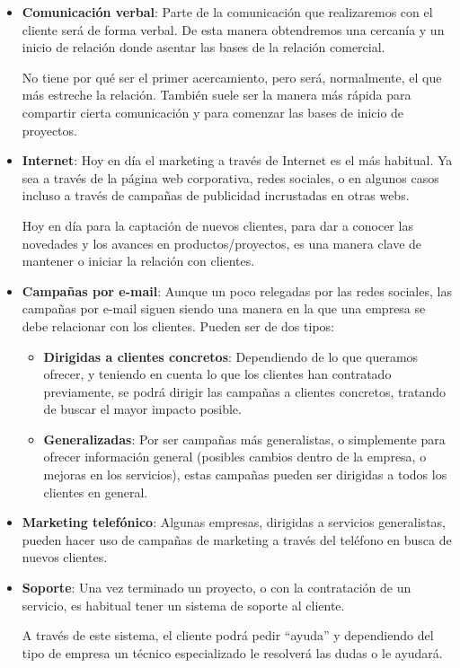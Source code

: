 \begin{itemize}
    \item \textbf{Comunicación verbal}: Parte de la comunicación que realizaremos con el cliente será de forma verbal. De esta manera obtendremos una cercanía y un inicio de relación donde asentar las bases de la relación comercial.

    No tiene por qué ser el primer acercamiento, pero será, normalmente, el que más estreche la relación. También suele ser la manera más rápida para compartir cierta comunicación y para comenzar las bases de inicio de proyectos.

    \item \textbf{Internet}: Hoy en día el marketing a través de Internet es el más habitual. Ya sea a través de la página web corporativa, redes sociales, o en algunos casos incluso a través de campañas de publicidad incrustadas en otras webs.

    Hoy en día para la captación de nuevos clientes, para dar a conocer las novedades y los avances en productos/proyectos, es una manera clave de mantener o iniciar la relación con clientes.

    \item \textbf{Campañas por e-mail}: Aunque un poco relegadas por las redes sociales, las campañas por e-mail siguen siendo una manera en la que una empresa se debe relacionar con los clientes. Pueden ser de dos tipos:
    \begin{itemize}
        \item \textbf{Dirigidas a clientes concretos}: Dependiendo de lo que queramos ofrecer, y teniendo en cuenta lo que los clientes han contratado previamente, se podrá dirigir las campañas a clientes concretos, tratando de buscar el mayor impacto posible.

        \item \textbf{Generalizadas}: Por ser campañas más generalistas, o simplemente para ofrecer información general (posibles cambios dentro de la empresa, o mejoras en los servicios), estas campañas pueden ser dirigidas a todos los clientes en general.
    \end{itemize}

    \item \textbf{Marketing telefónico}: Algunas empresas, dirigidas a servicios generalistas, pueden hacer uso de campañas de marketing a través del teléfono en busca de nuevos clientes.

    \item \textbf{Soporte}: Una vez terminado un proyecto, o con la contratación de un servicio, es habitual tener un sistema de soporte al cliente.

    A través de este sistema, el cliente podrá pedir “ayuda” y dependiendo del tipo de empresa un técnico especializado le resolverá las dudas o le ayudará.
\end{itemize}